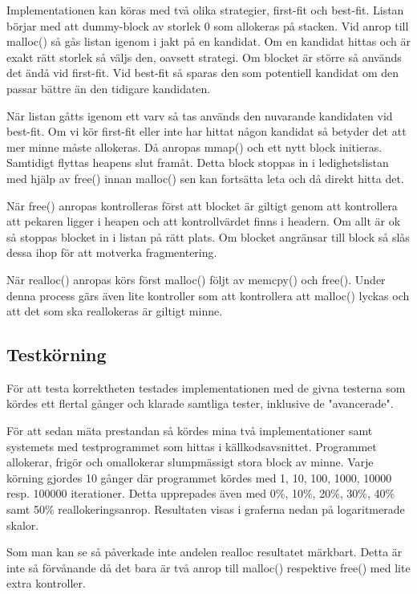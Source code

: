 \documentclass[10pt,a4paper]{article}
\begin{document}
Implementationen kan köras med två olika strategier, first-fit och best-fit. Listan börjar med att dummy-block av storlek 0 som allokeras på stacken. Vid anrop till malloc() så gås listan igenom i jakt på en kandidat. Om en kandidat hittas och är exakt rätt storlek så väljs den, oavsett strategi. Om blocket är större så används det ändå vid first-fit. Vid best-fit så sparas den som potentiell kandidat om den passar bättre än den tidigare kandidaten.

När listan gåtts igenom ett varv så tas används den nuvarande kandidaten vid best-fit. Om vi kör first-fit eller inte har hittat någon kandidat så betyder det att mer minne måste allokeras. Då anropas mmap() och ett nytt block initieras. Samtidigt flyttas heapens slut framåt. Detta block stoppas in i ledighetslistan med hjälp av free() innan malloc() sen kan fortsätta leta och då direkt hitta det.

När free() anropas kontrolleras först att blocket är giltigt genom att kontrollera att pekaren ligger i heapen och att kontrollvärdet finns i headern. Om allt är ok så stoppas blocket in i listan på rätt plats. Om blocket angränsar till block så slås dessa ihop för att motverka fragmentering.

När realloc() anropas körs först malloc() följt av memcpy() och free(). Under denna process gärs även lite kontroller som att kontrollera att malloc() lyckas och att det som ska reallokeras är giltigt minne.

\clearpage
\subsection{Testkörning}

För att testa korrektheten testades implementationen med de givna testerna som kördes ett flertal gånger och klarade samtliga tester, inklusive de "avancerade".

För att sedan mäta prestandan så kördes mina två implementationer samt systemets med testprogrammet som hittas i källkodsavsnittet. Programmet allokerar, frigör och omallokerar slumpmässigt stora block av minne. Varje körning gjordes 10 gånger där programmet kördes med 1, 10, 100, 1000, 10000 resp. 100000 iterationer. Detta upprepades även med 0\%, 10\%, 20\%, 30\%, 40\% samt 50\% reallokeringsanrop. Resultaten visas i graferna nedan på logaritmerade skalor.

Som man kan se så påverkade inte andelen realloc resultatet märkbart. Detta är inte så förvånande då det bara är två anrop till malloc() respektive free() med lite extra kontroller.
\end{document}
